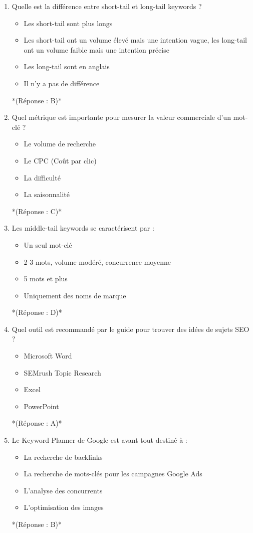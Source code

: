\documentclass[12pt,a4paper,twoside]{report}
\begin{document}
\begin{enumerate}
\item Quelle est la différence entre short-tail et long-tail keywords ?
\begin{itemize}
\item[A)] Les short-tail sont plus longs
\item[B)] Les short-tail ont un volume élevé mais une intention vague, les long-tail ont un volume faible mais une intention précise
\item[C)] Les long-tail sont en anglais
\item[D)] Il n'y a pas de différence
\end{itemize}
*(Réponse : B)*

\item Quel métrique est importante pour mesurer la valeur commerciale d'un mot-clé ?
\begin{itemize}
\item[A)] Le volume de recherche
\item[B)] Le CPC (Coût par clic)
\item[C)] La difficulté
\item[D)] La saisonnalité
\end{itemize}
*(Réponse : C)*

\item Les middle-tail keywords se caractérisent par :
\begin{itemize}
\item[A)] Un seul mot-clé
\item[B)] 2-3 mots, volume modéré, concurrence moyenne
\item[C)] 5 mots et plus
\item[D)] Uniquement des noms de marque
\end{itemize}
*(Réponse : D)*

\item Quel outil est recommandé par le guide pour trouver des idées de sujets SEO ?
\begin{itemize}
\item[A)] Microsoft Word
\item[B)] SEMrush Topic Research
\item[C)] Excel
\item[D)] PowerPoint
\end{itemize}
*(Réponse : A)*

\item Le Keyword Planner de Google est avant tout destiné à :
\begin{itemize}
\item[A)] La recherche de backlinks
\item[B)] La recherche de mots-clés pour les campagnes Google Ads
\item[C)] L'analyse des concurrents
\item[D)] L'optimisation des images
\end{itemize}
*(Réponse : B)*


\end{enumerate}
\end{document}
